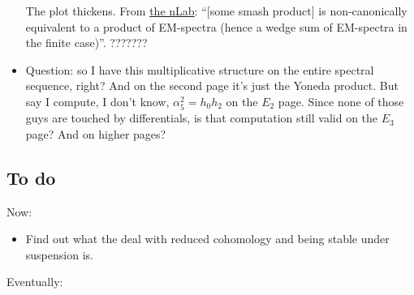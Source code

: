 \documentclass{MetricNotes2023}
\begin{document}
\begin{itemize}
The plot thickens. From \href{https://ncatlab.org/nlab/show/Eilenberg-Mac+Lane+spectrum}{the nLab}: ``[some smash product] is non-canonically equivalent to a product of EM-spectra (hence a wedge sum of EM-spectra in the finite case)''. ???????

\item Question: so I have this multiplicative structure on the entire spectral sequence, right? And on the second page it's just the Yoneda product. But say I compute, I don't know, \(\alpha^2_5=h_0h_2\) on the \(E_2\)  page. Since none of those guys are touched by differentials, is that computation still valid on the \(E_3\) page? And on higher pages?
\end{itemize}

\subsection{To do}\label{2503221342}

Now:

\begin{itemize}
\item Find out what the deal with reduced cohomology and being stable under suspension is.
\end{itemize}

Eventually:
\end{document}
